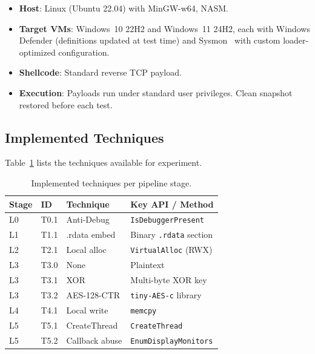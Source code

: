 \documentclass[10pt,a4paper,twocolumn]{article}
\begin{document}
\begin{itemize}[leftmargin=*, itemsep=1pt]
    \item \textbf{Host}: Linux (Ubuntu 22.04) with MinGW-w64, NASM.
    \item \textbf{Target VMs}: Windows~10 22H2 and Windows~11 24H2, each with Windows Defender (definitions updated at test time) and Sysmon~\cite{sysmon} with custom loader-optimized configuration.
    \item \textbf{Shellcode}: Standard reverse TCP payload.
    \item \textbf{Execution}: Payloads run under standard user privileges. Clean snapshot restored before each test.
\end{itemize}

\subsection{Implemented Techniques}

Table~\ref{tab:techniques} lists the techniques available for experiment.

\begin{table}[htbp]
    \centering
    \caption{Implemented techniques per pipeline stage.}
    \label{tab:techniques}
    \small
    \begin{tabular}{@{}llll@{}}
        \toprule
        \textbf{Stage} & \textbf{ID} & \textbf{Technique} & \textbf{Key API / Method} \\
        \midrule
        L0 & T0.1 & Anti-Debug       & \texttt{IsDebuggerPresent} \\
        L1 & T1.1 & .rdata embed     & Binary \texttt{.rdata} section \\
        L2 & T2.1 & Local alloc      & \texttt{VirtualAlloc} (RWX) \\
        L3 & T3.0 & None             & Plaintext \\
        L3 & T3.1 & XOR              & Multi-byte XOR key \\
        L3 & T3.2 & AES-128-CTR      & \texttt{tiny-AES-c} library \\
        L4 & T4.1 & Local write      & \texttt{memcpy} \\
        L5 & T5.1 & CreateThread     & \texttt{CreateThread} \\
        L5 & T5.2 & Callback abuse   & \texttt{EnumDisplayMonitors} \\
        \bottomrule
    \end{tabular}
\end{table}
\end{document}
